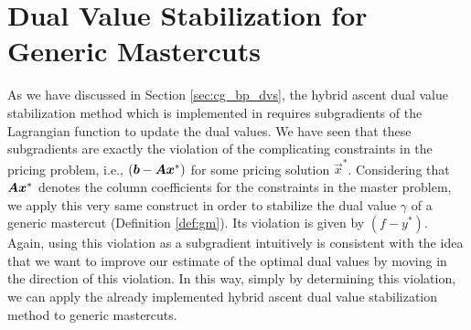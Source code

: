 \section{Dual Value Stabilization for Generic Mastercuts}\label{sec:gm_dvs}
As we have discussed in Section \ref{sec:cg_bp_dvs}, the hybrid ascent dual value stabilization method which is implemented in \GCG{} requires subgradients of the Lagrangian function to update the dual values. We have seen that these subgradients are exactly the violation of the complicating constraints in the pricing problem, i.e., $\left( {\bm{b}} - {\bm{A}} {\bm{x}}^* \right)$ for some pricing solution $\vec{x}^*$. Considering that ${\bm{A}} {\bm{x}}^*$ denotes the column coefficients for the constraints in the master problem, we apply this very same construct in order to stabilize the dual value $\gamma$ of a generic mastercut (Definition \ref{def:gm}). Its violation is given by $\left( f - y^* \right)$. Again, using this violation as a subgradient intuitively is consistent with the idea that we want to improve our estimate of the optimal dual values by moving in the direction of this violation. In this way, simply by determining this violation, we can apply the already implemented hybrid ascent dual value stabilization method to generic mastercuts.